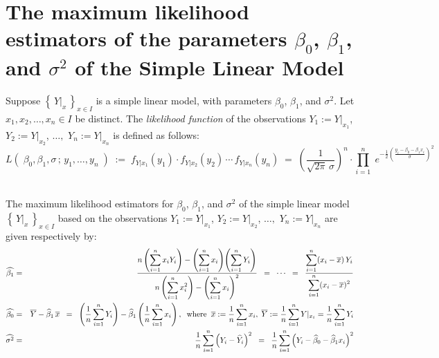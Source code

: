 \documentclass{article}
\begin{document}

\section{The maximum likelihood estimators of the parameters $\beta_{0}$, $\beta_{1}$, and $\sigma^{2}$ of the Simple Linear Model}
\setcounter{theorem}{0}

Suppose $\left\{\,Y|_{x}\,\right\}_{x\in I}$ is a simple linear model, with parameters $\beta_{0}$, $\beta_{1}$, and $\sigma^{2}$.  Let $x_{1}, x_{2}, \ldots, x_{n} \in I$ be distinct.
The \emph{likelihood function} of the observations $Y_{1} := Y|_{x_{1}}$, $Y_{2} := Y|_{x_{2}}$, $\ldots,$ $Y_{n} := Y|_{x_{n}}$ is defined as follows:
\begin{equation*}
   L\!\left(\;\beta_{0},\beta_{1},\sigma\,;\,y_{1},\ldots,y_{n}\;\right)
   \; := \;
    f_{Y|x_{1}}(y_{1}) \cdot f_{Y|x_{2}}(y_{2})\,\cdots\,f_{Y|x_{n}}(y_{n})
   \; = \;
   \left(\dfrac{1}{\sqrt{2\pi}\,\sigma}\right)^{n}\cdot\displaystyle{\prod^{n}_{i=1}} \; e^{-\frac{1}{2}\left(\frac{y_{i}-\beta_{0}-\beta_{1}x_{i}}{\sigma}\right)^{2}}
\end{equation*}
\begin{theorem}\mbox{}\\
The maximum likelihood estimators for $\beta_{0}$, $\beta_{1}$, and $\sigma^{2}$ of the simple linear model $\left\{\,Y|_{x}\,\right\}_{x\in I}$ based on the observations $Y_{1} := Y|_{x_{1}}$, $Y_{2} := Y|_{x_{2}}$, $\ldots,$ $Y_{n} := Y|_{x_{n}}$ are given respectively by:
\begin{eqnarray*}
\widehat{\beta_{1}} & = &
\dfrac{n\left(\displaystyle{\sum^{n}_{i=1}}\,x_{i}Y_{i}\right) - \left(\displaystyle{\sum^{n}_{i=1}}\,x_{i}\right)\!\left(\displaystyle{\sum^{n}_{i=1}}\,Y_{i}\right)}{n\left(\displaystyle{\sum^{n}_{i=1}}\,x_{i}^{2}\right) - \left(\displaystyle{\sum^{n}_{i=1}}\,x_{i}\right)^{2}} \;\;=\;\; \cdots \;\;=\;\; \dfrac{\displaystyle{\sum^{n}_{i=1}}(x_{i}-\overline{x})\,Y_{i}}{\displaystyle{\sum^{n}_{i=1}}(x_{i}-\overline{x})^{2}}\\
\widehat{\beta_{0}} & = & \overline{Y} - \widehat{\beta}_{1}\,\overline{x}
\;\; = \;\; \left(\dfrac{1}{n}\sum^{n}_{i=1}Y_{i}\right) - \widehat{\beta}_{1}\left(\dfrac{1}{n}\sum^{n}_{i=1}x_{i}\right),
\;\;\textnormal{where}\;\; \overline{x} := \dfrac{1}{n}\sum^{n}_{i=1}x_{i}, \; \overline{Y} := \dfrac{1}{n}\sum^{n}_{i=1}Y|_{x_{i}} = \dfrac{1}{n}\sum^{n}_{i=1}Y_{i} \\
\widehat{\sigma^{2}} & = & \dfrac{1}{n}\sum^{n}_{i=1}\left(Y_{i}-\widehat{Y}_{i}\right)^{2}
\;\; = \;\; \dfrac{1}{n}\sum^{n}_{i=1}\left(Y_{i}-\widehat{\beta}_{0}-\widehat{\beta}_{1}x_{i}\right)^{2}
\end{eqnarray*}
\end{theorem}
\end{document}
